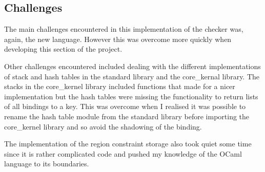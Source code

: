 \subsection{Challenges}
The main challenges encountered in this implementation of the checker was, again, the new language. However this was overcome more quickly when developing this section of the project.

Other challenges encountered included dealing with the different implementations of stack and hash tables in the standard library and the core_kernal library. The stacks in the core_kernel library included functions that made for a nicer implementation but the hash tables were missing the functionality to return lists of all bindings to a key. This was overcome when I realised it was possible to rename the hash table module from the standard library before importing the core_kernel library and so avoid the shadowing of the binding. 

The implementation of the region constraint storage also took quiet some time since it is rather complicated code and pushed my knowledge of the OCaml language to its boundaries. 


